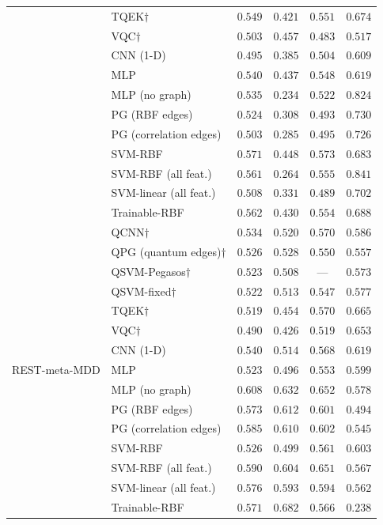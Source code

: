 \begin{table}[t]
\begin{tabular}{|l|l|c|c|c|c|}
  & TQEK$\dagger$ & $0.549$ & $0.421$ & $0.551$ & $0.674$ \\
  & VQC$\dagger$ & $0.503$ & $0.457$ & $0.483$ & $0.517$ \\
  & CNN (1-D) & $0.495$ & $0.385$ & $0.504$ & $0.609$ \\
  & MLP & $0.540$ & $0.437$ & $0.548$ & $0.619$ \\
  & MLP (no graph) & $0.535$ & $0.234$ & $0.522$ & $0.824$ \\
  & PG (RBF edges) & $0.524$ & $0.308$ & $0.493$ & $0.730$ \\
  & PG (correlation edges) & $0.503$ & $0.285$ & $0.495$ & $0.726$ \\
  & SVM-RBF & $0.571$ & $0.448$ & $0.573$ & $0.683$ \\
  & SVM-RBF (all feat.) & $0.561$ & $0.264$ & $0.555$ & $0.841$ \\
  & SVM-linear (all feat.) & $0.508$ & $0.331$ & $0.489$ & $0.702$ \\
  & Trainable-RBF & $0.562$ & $0.430$ & $0.554$ & $0.688$ \\
\hline
 \multirow{15}{*}{REST-meta-MDD} & QCNN$\dagger$ & $0.534$ & $0.520$ & $0.570$ & $0.586$ \\
  & QPG (quantum edges)$\dagger$ & $0.526$ & $0.528$ & $0.550$ & $0.557$ \\
  & QSVM-Pegasos$\dagger$ & $0.523$ & $0.508$ & --- & $0.573$ \\
  & QSVM-fixed$\dagger$ & $0.522$ & $0.513$ & $0.547$ & $0.577$ \\
  & TQEK$\dagger$ & $0.519$ & $0.454$ & $0.570$ & $0.665$ \\
  & VQC$\dagger$ & $0.490$ & $0.426$ & $0.519$ & $0.653$ \\
  & CNN (1-D) & $0.540$ & $0.514$ & $0.568$ & $0.619$ \\
  & MLP & $0.523$ & $0.496$ & $0.553$ & $0.599$ \\
  & MLP (no graph) & $0.608$ & $0.632$ & $0.652$ & $0.578$ \\
  & PG (RBF edges) & $0.573$ & $0.612$ & $0.601$ & $0.494$ \\
  & PG (correlation edges) & $0.585$ & $0.610$ & $0.602$ & $0.545$ \\
  & SVM-RBF & $0.526$ & $0.499$ & $0.561$ & $0.603$ \\
  & SVM-RBF (all feat.) & $0.590$ & $0.604$ & $0.651$ & $0.567$ \\
  & SVM-linear (all feat.) & $0.576$ & $0.593$ & $0.594$ & $0.562$ \\
  & Trainable-RBF & $0.571$ & $0.682$ & $0.566$ & $0.238$ \\

\end{tabular}
\end{table}
